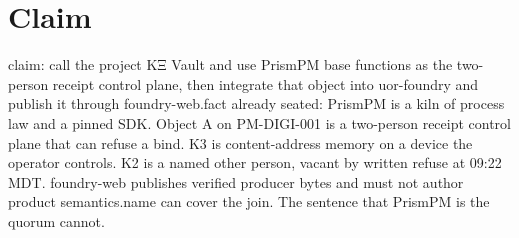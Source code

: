 \section{Claim}\nInventor claim: call the project KΞ Vault and use PrismPM base functions as the two-person receipt control plane, then integrate that object into uor-foundry and publish it through foundry-web.\n\nOperating fact already seated: PrismPM is a kiln of process law and a pinned SDK. Object A on PM-DIGI-001 is a two-person receipt control plane that can refuse a bind. K3 is content-address memory on a device the operator controls. K2 is a named other person, vacant by written refuse at 09:22 MDT. foundry-web publishes verified producer bytes and must not author product semantics.\n\nThe name can cover the join. The sentence that PrismPM is the quorum cannot.
